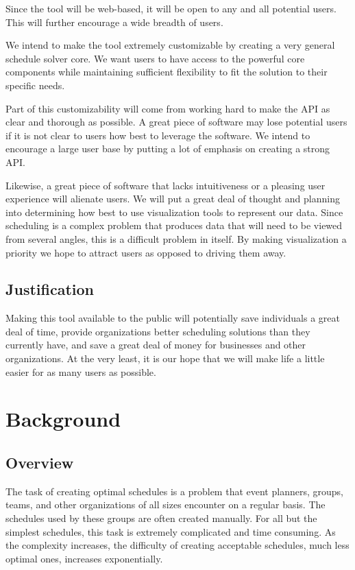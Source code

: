 \documentclass{extarticle}
\begin{document}
Since the tool will be web-based, it will be open to any and all potential users.  This will further encourage a
wide breadth of users.

We intend to make the tool extremely customizable by creating a very general schedule solver core.
We want users to have access to the powerful core components while maintaining sufficient flexibility to fit the
solution to their specific needs.

Part of this customizability will come from working hard to make the API as clear and thorough as possible.  A
great piece of software may lose potential users if it is not clear to users how best to leverage the software.  We
intend to encourage a large user base by putting a lot of emphasis on creating a strong API.

Likewise, a great piece of software that lacks intuitiveness or a pleasing user experience will alienate users.
We will put a great deal of thought and planning into determining how best to use visualization tools to represent
our data.  Since scheduling is a complex problem that produces data that will need to be viewed from several angles,
this is a difficult problem in itself.  By making visualization a priority we hope to attract users as opposed to
driving them away.

\subsection{Justification}
Making this tool available to the public will potentially save individuals a great deal of time, provide
organizations better scheduling solutions than they currently have, and save a great deal
of money for businesses and other organizations.  At the very least, it is our hope that we will make life a little
easier for as many users as possible.

\section{Background}

\subsection{Overview} %
The task of creating optimal schedules is a problem that event planners, groups, teams, and other organizations of
all sizes encounter on a regular basis.  The schedules used by these groups are often created manually.  For all
but the simplest schedules, this task is extremely complicated and time consuming.  As the complexity increases,
the difficulty of creating acceptable schedules, much less optimal ones, increases exponentially.
\end{document}
